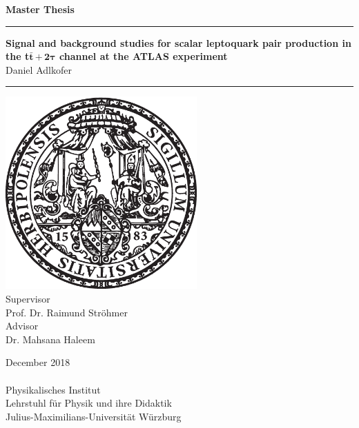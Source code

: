 \begin{titlepage}
  \vspace*{-7\baselineskip}
	\enlargethispage{100mm}
		\begin{center}
		\LARGE{\textbf{Master Thesis}\\}
		\vspace{3mm}	
		\textcolor{royalazure}{\noindent\rule{\textwidth}{3pt}}
		\huge{\textbf{Signal and background studies for scalar leptoquark pair production in the t$\bar{\textbf{t}}\,\mathbf{+\,2\tau}$ channel at the ATLAS experiment}\\}
		\vspace{3mm}
		\Large{Daniel Adlkofer\\}
		\textcolor{royalazure}{\noindent\rule{\textwidth}{3pt}}
		\vspace{3mm}
        \includegraphics[width=0.55\textwidth]{figures/neuSIEGEL.eps} \\
		\vspace{3mm}
		Supervisor \\
		\Large{Prof. Dr. Raimund Str\"{o}hmer\\}
               	\vspace{3mm}
                Advisor \\
    \Large{Dr. Mahsana Haleem\\}
               	\vspace{3mm}

		\vspace{5mm}
		December 2018\\
		  \noindent\hrulefill\\
		\vspace{3mm}
 		Physikalisches Institut\\
 		Lehrstuhl f\"{u}r Physik und ihre Didaktik\\
	    Julius-Maximilians-Universit\"{a}t W\"{u}rzburg
	\end{center}
\end{titlepage}
\cleardoubleoddemptypage
